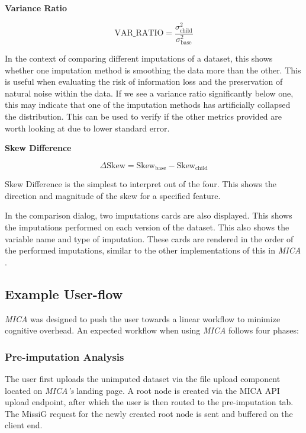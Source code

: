 \documentclass[a4paper, 11pt]{article}
\newcommand{\mica}{\textit{MICA }}
\newcommand{\micas}{\textit{MICA's }}
\begin{document}
\textbf{Variance Ratio} 

\begin{equation}
\mathrm{VAR\_RATIO} = \frac{\sigma^2_{\text{child}}}{\sigma^2_{\text{base}}}
\end{equation}

In the context of comparing different imputations of a dataset, this shows
whether one imputation method is smoothing the data more than the other. This
is useful when evaluating the risk of information loss and the preservation of
natural noise within the data. If we see a variance ratio significantly below
one, this may indicate that one of the imputation methods has artificially
collapsed the distribution. This can be used to verify if the other metrics
provided are worth looking at due to lower standard error.

\textbf{Skew Difference} 

\begin{equation}
\Delta \mathrm{Skew} = \mathrm{Skew}_{\text{base}} - \mathrm{Skew}_{\text{child}}
\end{equation}

Skew Difference is the simplest to interpret out of the four. This shows the
direction and magnitude of the skew for a specified feature. 

In the comparison dialog, two imputations cards are also displayed. This shows
the imputations performed on each version of the dataset. This also shows the
variable name and type of imputation. These cards are rendered in the order of
the performed imputations, similar to the other implementations of this in
\mica.

\subsection{Example User-flow}

\mica was designed to push the user towards a linear workflow to minimize
cognitive overhead. An expected workflow when using \mica follows four phases:

\subsubsection*{Pre-imputation Analysis}
The user first uploads the unimputed dataset via the file upload component
located on \micas landing page. A root node is created via the MICA API upload
endpoint, after which the user is then routed to the pre-imputation tab. The
MissiG request for the newly created root node is sent and buffered on the
client end.
\end{document}
